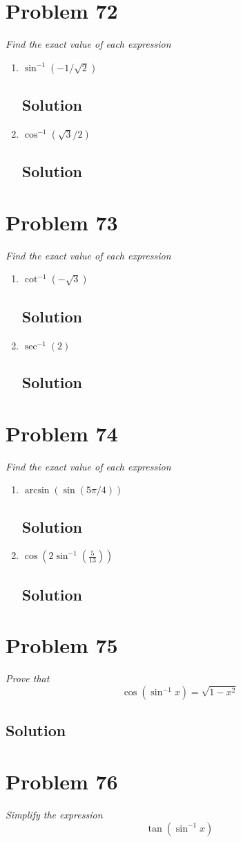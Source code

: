 \documentclass[11pt]{article}
\newcommand{\soln}{\subsection*}
\newcommand{\qn}{\textit}
\begin{document}
\section*{Problem 72}

\qn{Find the exact value of each expression}
\begin{enumerate}
	\item \qn{$\sin^{-1}(-1/\sqrt{2})$}
	\soln{Solution}
	
	\item \qn{$\cos^{-1}(\sqrt{3}/2)$}
	\soln{Solution}
\end{enumerate}

\section*{Problem 73}

\qn{Find the exact value of each expression}
\begin{enumerate}
	\item \qn{$\cot^{-1}(-\sqrt{3})$}
	\soln{Solution}
	
	\item \qn{$\sec^{-1}(2)$}
	\soln{Solution}
\end{enumerate}

\section*{Problem 74}

\qn{Find the exact value of each expression}
\begin{enumerate}
	\item \qn{$\arcsin(\sin(5\pi/4))$}
	\soln{Solution}
	
	\item \qn{$\cos(2\sin^{-1}(\frac{5}{13}))$}
	\soln{Solution}
\end{enumerate}

\section*{Problem 75}

\qn{Prove that $$\cos(\sin^{-1}x)=\sqrt{1-x^2}$$}

\soln{Solution}

\section*{Problem 76}

\qn{Simplify the expression $$\tan(\sin^{-1}x)$$}
\end{document}
